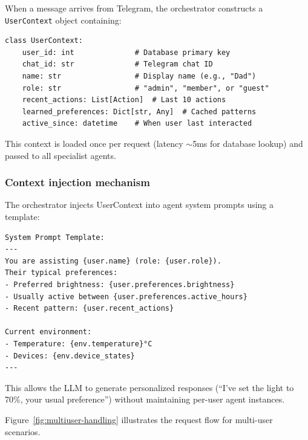 When a message arrives from Telegram, the orchestrator constructs a \texttt{UserContext} object containing:

\begin{verbatim}
class UserContext:
    user_id: int              # Database primary key
    chat_id: str              # Telegram chat ID
    name: str                 # Display name (e.g., "Dad")
    role: str                 # "admin", "member", or "guest"
    recent_actions: List[Action]  # Last 10 actions
    learned_preferences: Dict[str, Any]  # Cached patterns
    active_since: datetime    # When user last interacted
\end{verbatim}

This context is loaded once per request (latency $\sim$5ms for database lookup) and passed to all specialist agents.

\subsubsection{Context injection mechanism}

The orchestrator injects UserContext into agent system prompts using a template:

\begin{verbatim}
System Prompt Template:
---
You are assisting {user.name} (role: {user.role}).
Their typical preferences:
- Preferred brightness: {user.preferences.brightness}
- Usually active between {user.preferences.active_hours}
- Recent pattern: {user.recent_actions}

Current environment:
- Temperature: {env.temperature}°C
- Devices: {env.device_states}
---
\end{verbatim}

This allows the LLM to generate personalized responses (``I've set the light to 70\%, your usual preference'') without maintaining per-user agent instances.

Figure~\ref{fig:multiuser-handling} illustrates the request flow for multi-user scenarios.

